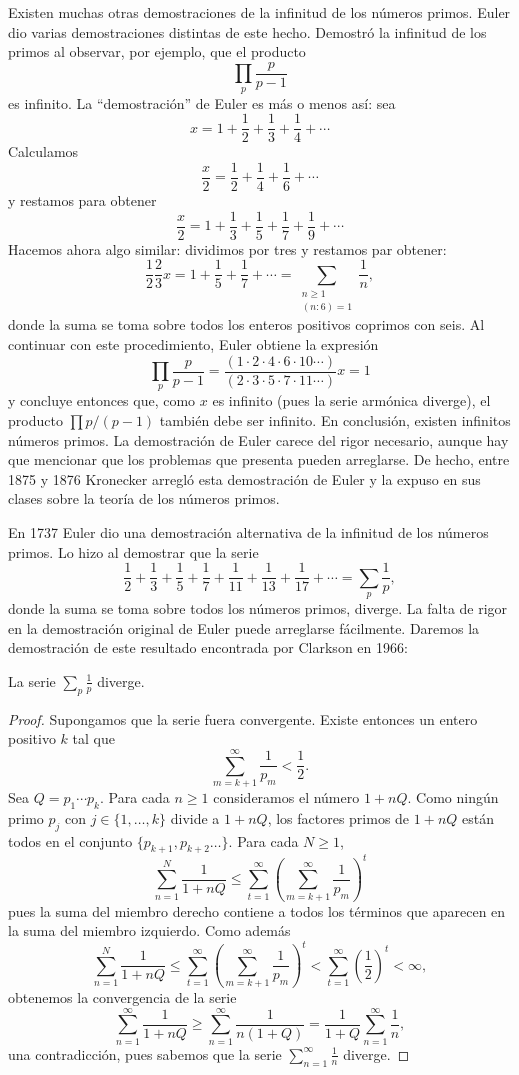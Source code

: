 Existen muchas otras demostraciones de la infinitud de los números primos. 
Euler dio varias demostraciones distintas de este hecho. Demostró la infinitud
de los primos al observar, por ejemplo, que el producto
\[
	\prod_{p}\frac{p}{p-1}
\]
es infinito. La ``demostración'' de Euler es más o menos así: sea
\[
	x=1+\frac12+\frac13+\frac14+\cdots
\]
Calculamos 
\[
	\frac{x}{2}=\frac12+\frac14+\frac16+\cdots
\]
y restamos para obtener
\[
	\frac{x}{2}=1+\frac13+\frac15+\frac17+\frac19+\cdots
\]
Hacemos ahora algo similar: dividimos por tres y restamos par obtener:
\[
	\frac12\frac23x=1+\frac15+\frac17+\cdots=\sum_{\substack{n\geq1\\(n:6)=1}}\frac1n,
\]
donde la suma se toma sobre todos los enteros positivos coprimos con seis. Al
continuar con este procedimiento, Euler obtiene la expresión
\[
	\prod_p\frac{p}{p-1}
	=\frac{(1\cdot 2\cdot 4\cdot 6\cdot 10\cdots)}{(2\cdot 3\cdot 5\cdot 7\cdot 11\cdots)}x=1
\]
y concluye entonces que, como $x$ es infinito (pues la serie armónica diverge),
el producto $\prod p/(p-1)$ también debe ser infinito. En conclusión, existen
infinitos números primos. La demostración de Euler carece del rigor necesario,
aunque hay que mencionar que los problemas que presenta pueden arreglarse. De
hecho, entre 1875 y 1876 Kronecker arregló esta demostración de Euler y la
expuso en sus clases sobre la teoría de los números primos.

En 1737 Euler dio una demostración alternativa de la infinitud de los números
primos. Lo hizo al demostrar que la serie
\[
	\frac12+\frac13+\frac15+\frac17+\frac{1}{11}+\frac{1}{13}+\frac{1}{17}+\cdots=\sum_{p}\frac{1}{p},
\]
donde la suma se toma sobre todos los números primos, diverge. La falta de
rigor en la demostración original de Euler puede arreglarse fácilmente. Daremos
la demostración de este resultado encontrada por Clarkson en 1966:

\begin{theorem}[Euler]
	La serie $\sum_{p}\frac{1}{p}$ diverge. 
\end{theorem}

\begin{proof}
	Supongamos que la serie fuera convergente. Existe entonces un entero positivo $k$ tal que 
	\[
		\sum_{m=k+1}^{\infty}\frac{1}{p_m}<\frac12.
	\]
	Sea $Q=p_1\cdots p_k$. Para cada $n\geq1$ consideramos el número $1+nQ$.
	Como ningún primo $p_j$ con $j\in\{1,\dots,k\}$ divide a $1+nQ$, los
	factores primos de $1+nQ$ están todos en el conjunto $\{p_{k+1},p_{k+2}\dots\}$. Para cada $N\geq1$, 
	\[
		\sum_{n=1}^N\frac{1}{1+nQ}\leq \sum_{t=1}^\infty\left(\sum_{m=k+1}^{\infty}\frac{1}{p_m}\right)^t
	\]
	pues la suma del miembro derecho contiene a todos los términos que aparecen
	en la suma del miembro izquierdo. Como además 
	\[
		\sum_{n=1}^N\frac{1}{1+nQ}\leq \sum_{t=1}^\infty\left(\sum_{m=k+1}^{\infty}\frac{1}{p_m}\right)^t<\sum_{t=1}^\infty\left(\frac12\right)^t<\infty,
	\]
	obtenemos la convergencia de la serie 
	\[
		\sum_{n=1}^{\infty}\frac{1}{1+nQ}\geq\sum_{n=1}^\infty\frac{1}{n(1+Q)}=\frac{1}{1+Q}\sum_{n=1}^\infty\frac{1}{n},
	\]
	una contradicción, pues sabemos que la serie $\sum_{n=1}^\infty\frac{1}{n}$ diverge.
\end{proof}

